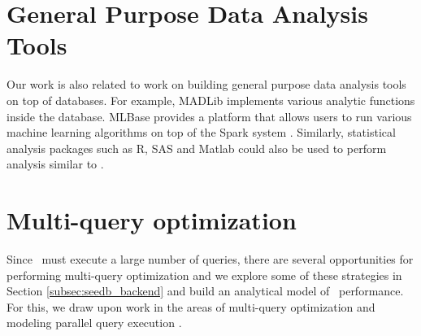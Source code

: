 \section{General Purpose Data Analysis Tools}
Our work is also related to work on building general purpose data analysis tools
on top of databases. For example, MADLib \cite{DBLP:conf/VLDB/HellersteinRSWF12}
implements various analytic functions inside the database. MLBase
\cite{DBLP:conf/CIDR/KraskaTDGFJ2013} provides a platform that allows users to
run various machine learning algorithms on top of the Spark system
\cite{DBLP:conf/SCC/ZahariaCFSS10}.
Similarly, statistical analysis packages such as R, SAS and Matlab could also be
used to perform analysis similar to \SeeDB.


\section{Multi-query optimization}
Since \SeeDB\ must execute a large number of queries, there are several
opportunities for performing multi-query optimization and we explore some of
these strategies in Section \ref{subsec:seedb_backend} and build an analytical model of
\SeeDB\ performance. For this, we draw upon work in the areas of multi-query
optimization and modeling parallel query execution \cite{DBLP:conf/VLDB/WuCHN13,
DBLP:journal/TODS/Sellis1988, DBLP:conf/VLDB/ZukowskiHNB07}.
